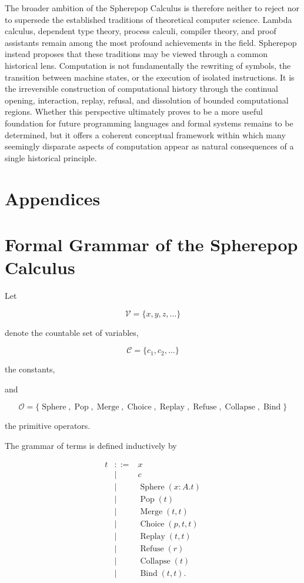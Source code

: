 \documentclass[12pt,oneside]{article}
\theoremstyle{definition}
\theoremstyle{remark}
\begin{document}
The broader ambition of the Spherepop Calculus is therefore neither to reject
nor to supersede the established traditions of theoretical computer science.
Lambda calculus, dependent type theory, process calculi, compiler theory, and
proof assistants remain among the most profound achievements in the field.
Spherepop instead proposes that these traditions may be viewed through a
common historical lens. Computation is not fundamentally the rewriting of
symbols, the transition between machine states, or the execution of isolated
instructions. It is the irreversible construction of computational history
through the continual opening, interaction, replay, refusal, and dissolution
of bounded computational regions. Whether this perspective ultimately proves
to be a more useful foundation for future programming languages and formal
systems remains to be determined, but it offers a coherent conceptual
framework within which many seemingly disparate aspects of computation appear
as natural consequences of a single historical principle.

\newpage 
\section*{Appendices}

\appendix

\section{Formal Grammar of the Spherepop Calculus}

Let

\[
\mathcal{V}
=
\{x,y,z,\ldots\}
\]

denote the countable set of variables,

\[
\mathcal{C}
=
\{c_1,c_2,\ldots\}
\]

the constants,

and

\[
\mathcal{O}
=
\{
\operatorname{Sphere},
\operatorname{Pop},
\operatorname{Merge},
\operatorname{Choice},
\operatorname{Replay},
\operatorname{Refuse},
\operatorname{Collapse},
\operatorname{Bind}
\}
\]

the primitive operators.

The grammar of terms is defined inductively by

\[
\begin{array}{rcl}
t
&::=&
x
\\
&|&
c
\\
&|&
\operatorname{Sphere}(x:A.t)
\\
&|&
\operatorname{Pop}(t)
\\
&|&
\operatorname{Merge}(t,t)
\\
&|&
\operatorname{Choice}(p,t,t)
\\
&|&
\operatorname{Replay}(t,t)
\\
&|&
\operatorname{Refuse}(r)
\\
&|&
\operatorname{Collapse}(t)
\\
&|&
\operatorname{Bind}(t,t).
\end{array}
\]
\end{document}
